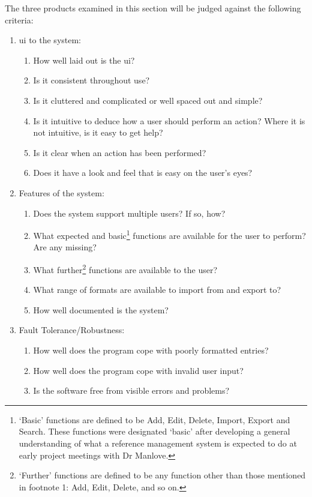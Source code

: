 The three products examined in this section will be judged against the following criteria:
\begin{enumerate}
	\item \gls{ui} to the system:
	\begin{enumerate}
		\item How well laid out is the \gls{ui}? 
		\item Is it consistent throughout use?
		\item Is it cluttered and complicated or well spaced out and simple?
		\item Is it intuitive to deduce how a user should perform an action? Where it is not intuitive, is it easy to get help?
		\item Is it clear when an action has been performed?
		\item Does it have a look and feel that is easy on the user's eyes?
	\end{enumerate}
	\item Features of the system:
	\begin{enumerate}
		\item Does the system support multiple users? If so, how?
		\item What expected and basic\footnote{`Basic' functions are defined to be Add, Edit, Delete, Import, Export and Search. These functions were designated `basic' after developing a general understanding of what a reference management system is expected to do at early project meetings with Dr Manlove.} functions are available for the user to perform? Are any missing?
		\item What further\footnote{`Further' functions are defined to be any function other than those mentioned in footnote 1: Add, Edit, Delete, and so on.} functions are available to the user? 
		\item What range of formats are available to import from and export to?
		\item How well documented is the system?
	\end{enumerate}
	\item Fault Tolerance/Robustness:
	\begin{enumerate}
		\item How well does the program cope with poorly formatted entries?
		\item How well does the program cope with invalid user input?
		\item Is the software free from visible errors and problems?
	\end{enumerate}
\end{enumerate}

